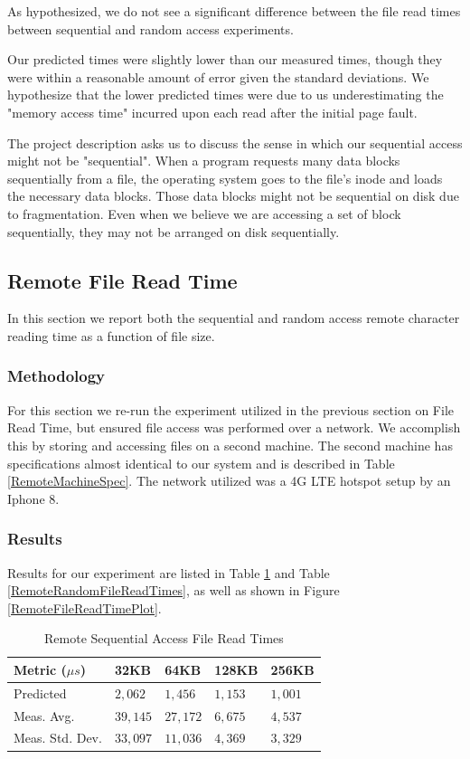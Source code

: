 \documentclass[sigconf]{acmart}
\begin{document}
As hypothesized, we do not see a significant difference between the file read times between sequential and random access experiments.

Our predicted times were slightly lower than our measured times, though they were within a reasonable amount of error given the standard deviations. We hypothesize that the lower predicted times were due to us underestimating the "memory access time" incurred upon each read after the initial page fault.

The project description asks us to discuss the sense in which our sequential access might not be "sequential". When a program requests many data blocks sequentially from a file, the operating system goes to the file's inode and loads the necessary data blocks. Those data blocks might not be sequential on disk due to fragmentation. Even when we believe we are accessing a set of block sequentially, they may not be arranged on disk sequentially.

\subsection{Remote File Read Time}
In this section we report both the sequential and random access remote character reading time as a function of file size.

\subsubsection{Methodology}
For this section we re-run the experiment utilized in the previous section on File Read Time, but ensured file access was performed over a network. We accomplish this by storing and accessing files on a second machine. The second machine has specifications almost identical to our system and is described in Table \ref{RemoteMachineSpec}. The network utilized was a 4G LTE hotspot setup by an Iphone 8.

\subsubsection{Results}
Results for our experiment are listed in Table \ref{RemoteSequentialFileReadTimes} and Table \ref{RemoteRandomFileReadTimes}, as well as shown in Figure \ref{RemoteFileReadTimePlot}.

\begin{table}[h!]
\caption{Remote Sequential Access File Read Times}
\label{RemoteSequentialFileReadTimes}
\begin{tabular}{|l|l|l|l|l|}
\hline
\textbf{Metric ($\mu s$)}	& \textbf{32KB}	& \textbf{64KB}	& \textbf{128KB} & \textbf{256KB} 	\\ \hline
Predicted  					& $2,062$		& $1,456$		& $1,153$		& $1,001$			\\ \hline
Meas. Avg.					& $39,145$		& $27,172$		& $6,675$		& $4,537$			\\ \hline
Meas. Std. Dev. 			& $33,097$		& $11,036$		& $4,369$		& $3,329$			\\ \hline
\end{tabular}
\end{table}
\end{document}
